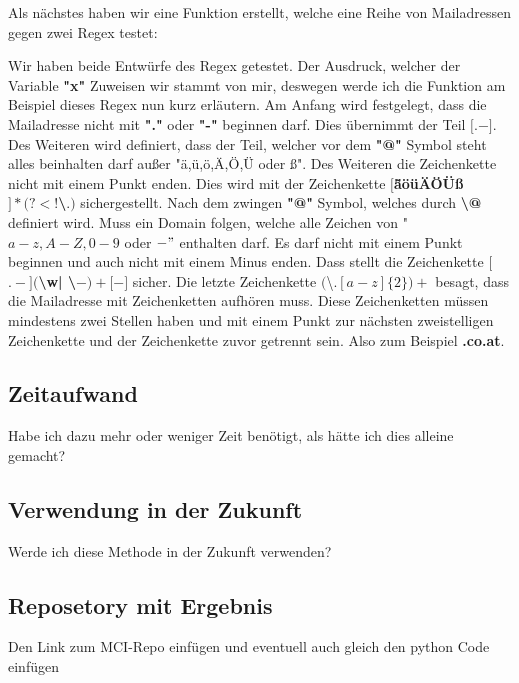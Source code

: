 \documentclass[12pt]{article}
\begin{document}
Als nächstes haben wir eine Funktion erstellt, welche eine Reihe von Mailadressen gegen zwei Regex testet:

Wir haben beide Entwürfe des Regex getestet. Der Ausdruck, welcher der Variable \textbf{"x"} Zuweisen wir stammt von mir, deswegen werde ich die Funktion am Beispiel dieses Regex nun kurz erläutern. Am Anfang wird festgelegt, dass die Mailadresse nicht mit \textbf{"."} oder \textbf{"-"} beginnen darf. Dies übernimmt der Teil \textbf{\^{$[$}\^{$.-]$}}. Des Weiteren wird definiert, dass der Teil, welcher vor dem \textbf{"@"} Symbol steht alles beinhalten darf außer "ä,ü,ö,Ä,Ö,Ü oder {\ss}". Des Weiteren die Zeichenkette nicht mit einem Punkt enden. Dies wird mit der Zeichenkette \textbf{$[$\^{äöüÄÖÜ{\ss}$]*(?<!$\textbackslash$.)$}} sichergestellt. Nach dem zwingen \textbf{"@"} Symbol, welches durch \textbf{\textbackslash @} definiert wird. Muss ein Domain folgen, welche alle Zeichen von "$a-z,A-Z,0-9$ oder $-"$ enthalten darf. Es darf nicht mit einem Punkt beginnen und auch nicht mit einem Minus enden. Dass stellt die Zeichenkette \textbf{$[$\^{$.-$}$]($\textbackslash w| \textbackslash$-)+[$\^{$-$}$]$} sicher. Die letzte Zeichenkette $($\textbackslash$.[a-z]\{2\})+$ besagt, dass die Mailadresse mit Zeichenketten aufhören muss. Diese Zeichenketten müssen mindestens zwei Stellen haben und mit einem Punkt zur nächsten zweistelligen Zeichenkette und der Zeichenkette zuvor getrennt sein. Also zum Beispiel \textbf{.co.at}.
\subsection{Zeitaufwand}
Habe ich dazu mehr oder weniger Zeit benötigt, als hätte ich dies alleine gemacht?
\subsection{Verwendung in der Zukunft}
Werde ich diese Methode in der Zukunft verwenden?
\subsection{Reposetory mit Ergebnis}
Den Link zum MCI-Repo einfügen und eventuell auch gleich den python Code einfügen

\listoffigures
\lstlistoflistings
\end{document}
